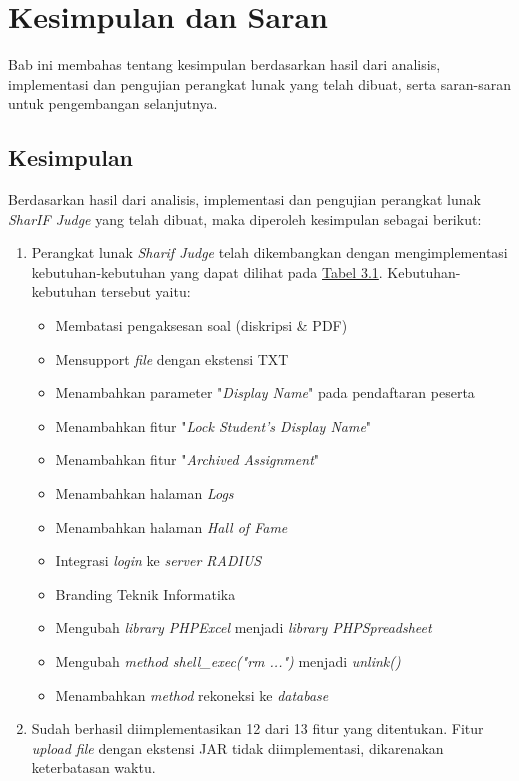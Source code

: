 \chapter{Kesimpulan dan Saran}
\label{chap:kesimpulan dan saran}

Bab ini membahas tentang kesimpulan berdasarkan hasil dari analisis, implementasi dan pengujian perangkat lunak yang telah dibuat, serta saran-saran untuk pengembangan selanjutnya.

\section{Kesimpulan}
Berdasarkan hasil dari analisis, implementasi dan pengujian perangkat lunak \textit{SharIF Judge} yang telah dibuat, maka diperoleh kesimpulan sebagai berikut:
\begin{enumerate}
	\item Perangkat lunak \textit{Sharif Judge} telah dikembangkan dengan mengimplementasi kebutuhan-kebutuhan yang dapat dilihat pada \hyperref[tab:kebutuhan]{Tabel 3.1}. Kebutuhan-kebutuhan tersebut yaitu:
	\begin{itemize}
		\item Membatasi pengaksesan soal (diskripsi \& PDF)
		\item Mensupport \textit{file} dengan ekstensi TXT
		\item Menambahkan parameter "\textit{Display Name}" pada pendaftaran peserta
		\item Menambahkan fitur "\textit{Lock Student's Display Name}"
		\item Menambahkan fitur "\textit{Archived Assignment}"
		\item Menambahkan halaman \textit{Logs}
		\item Menambahkan halaman \textit{Hall of Fame}
		\item Integrasi \textit{login} ke \textit{server RADIUS}
		\item Branding Teknik Informatika
		\item Mengubah \textit{library PHPExcel} menjadi \textit{library PHPSpreadsheet}
		\item Mengubah \textit{method shell\_exec("rm ...")} menjadi\textit{ unlink()}
		\item Menambahkan \textit{method} rekoneksi ke \textit{database}
	\end{itemize}

	\item Sudah berhasil diimplementasikan 12 dari 13 fitur yang ditentukan. Fitur \textit{upload file} dengan ekstensi JAR tidak diimplementasi, dikarenakan keterbatasan waktu.
\end{enumerate}

